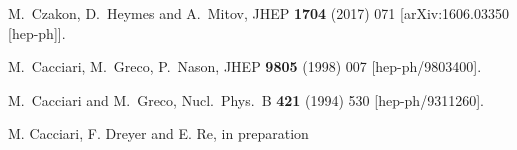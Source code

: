 \documentclass{PoS}
\begin{document}
\begin{thebibliography}{99}
  M.~Czakon, D.~Heymes and A.~Mitov,
  JHEP {\bf 1704} (2017) 071
  [arXiv:1606.03350 [hep-ph]].

  M.~Cacciari, M.~Greco, P.~Nason,
  JHEP {\bf 9805 } (1998)  007 
  [hep-ph/9803400].
    
  M.~Cacciari and M.~Greco,
  Nucl.\ Phys.\ B {\bf 421} (1994) 530
  [hep-ph/9311260].

 M. Cacciari, F. Dreyer and E. Re, in preparation
  
\end{thebibliography}
\end{document}
